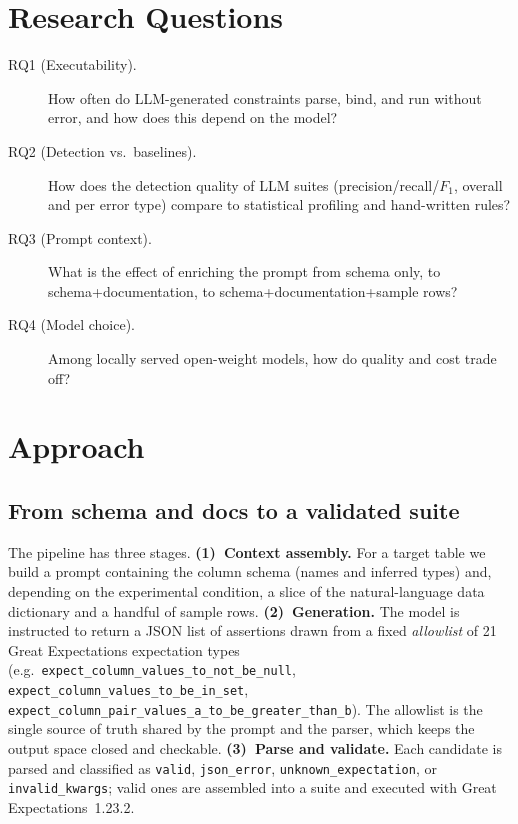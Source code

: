 \documentclass[10pt,twocolumn]{article}
\begin{document}
\section{Research Questions}
\begin{description}
  \item[RQ1 (Executability).] How often do LLM-generated constraints parse,
  bind, and run without error, and how does this depend on the model?
  \item[RQ2 (Detection vs.\ baselines).] How does the detection quality of
  LLM suites (precision/recall/$F_1$, overall and per error type) compare to
  statistical profiling and hand-written rules?
  \item[RQ3 (Prompt context).] What is the effect of enriching the prompt from
  schema only, to schema+documentation, to schema+documentation+sample rows?
  \item[RQ4 (Model choice).] Among locally served open-weight models, how do
  quality and cost trade off?
\end{description}

\section{Approach}\label{sec:approach}
\subsection{From schema and docs to a validated suite}
The pipeline has three stages. \textbf{(1)~Context assembly.} For a target table
we build a prompt containing the column schema (names and inferred types) and,
depending on the experimental condition, a slice of the natural-language data
dictionary and a handful of sample rows. \textbf{(2)~Generation.} The model is
instructed to return a JSON list of assertions drawn from a fixed
\emph{allowlist} of 21 Great Expectations expectation types (e.g.\
\texttt{expect\_column\_values\_to\_not\_be\_null},
\texttt{expect\_column\_values\_to\_be\_in\_set},
\texttt{expect\_column\_pair\_values\_a\_to\_be\_greater\_than\_b}). The allowlist
is the single source of truth shared by the prompt and the parser, which keeps the
output space closed and checkable. \textbf{(3)~Parse and validate.} Each candidate
is parsed and classified as \texttt{valid}, \texttt{json\_error},
\texttt{unknown\_expectation}, or \texttt{invalid\_kwargs}; valid ones are
assembled into a suite and executed with Great Expectations~1.23.2.
\end{document}
